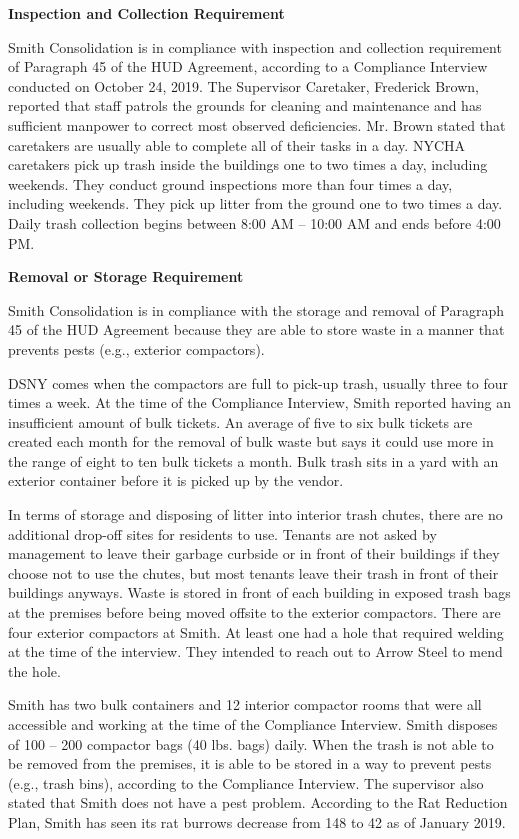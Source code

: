
\textbf{Inspection and Collection Requirement} 

Smith Consolidation is in compliance with inspection and collection requirement of Paragraph 45 of the HUD Agreement, according to a Compliance Interview conducted on October 24, 2019. The Supervisor Caretaker, Frederick Brown, reported that staff patrols the grounds for cleaning and maintenance and has sufficient manpower to correct most observed deficiencies. Mr. Brown stated that caretakers are usually able to complete all of their tasks in a day.  NYCHA caretakers pick up trash inside the buildings one to two times a day, including weekends. They conduct ground inspections more than four times a day, including weekends. They pick up litter from the ground one to two times a day. Daily trash collection begins between 8:00 AM -- 10:00 AM and ends before 4:00 PM. 

 

\textbf{Removal or Storage Requirement} 

Smith Consolidation is in compliance with the storage and removal of Paragraph 45 of the HUD Agreement because they are able to store waste in a manner that prevents pests (e.g., exterior compactors). 

DSNY comes when the compactors are full to pick-up trash, usually three to four times a week. At the time of the Compliance Interview, Smith reported having an insufficient amount of bulk tickets. An average of five to six bulk tickets are created each month for the removal of bulk waste but says it could use more in the range of eight to ten bulk tickets a month. Bulk trash sits in a yard with an exterior container before it is picked up by the vendor.  

 

In terms of storage and disposing of litter into interior trash chutes, there are no additional drop-off sites for residents to use. Tenants are not asked by management to leave their garbage curbside or in  front of their buildings if they choose not to use the chutes, but most tenants leave their trash in front of their buildings anyways. Waste is stored in front of each building in exposed trash bags at the premises before being moved offsite to the exterior compactors. There are four exterior compactors at Smith. At least one had a hole that required welding at the time of the interview. They intended to reach out to Arrow Steel to mend the hole.

 

Smith has two bulk containers and 12 interior compactor rooms that were all accessible and working at the time of the Compliance Interview. Smith disposes of 100 -- 200 compactor bags (40 lbs. bags) daily. When the trash is not able to be removed from the premises, it is able to be stored in a way to prevent pests (e.g., trash bins), according to the Compliance Interview. The supervisor also stated that Smith does not have a pest problem. According to the Rat Reduction Plan, Smith has seen its rat burrows decrease from 148 to 42 as of January 2019.


